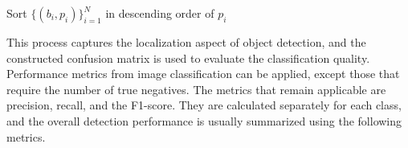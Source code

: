 \begin{algorithm}
    \caption{Prediction and ground truth matching algorithm}\label{alg:matching}
    Sort $\{(b_i, p_i)\}_{i=1}^N$ in descending order of $p_i$\\
\end{algorithm}

This process captures the localization aspect of object detection, and the constructed confusion matrix is used to evaluate the classification quality. Performance metrics from image classification can be applied, except those that require the number of true negatives. The metrics that remain applicable are precision, recall, and the F1-score. They are calculated separately for each class, and the overall detection performance is usually summarized using the following metrics.~\cite{Terven2025, Liu2020, Everingham2010}

